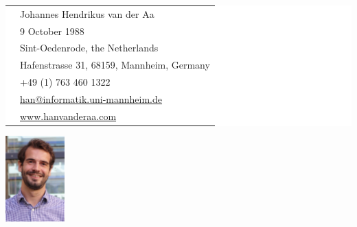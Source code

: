 \begin{paracol}{2}
	\hspace{2em}
\parbox[top][0.12\textheight][c]{1.00\linewidth}{ %
	\vspace{-0.04\textheight} %
	\colorbox{white}{ %
		\begin{supertabular}{ll} %
			 & Johannes Hendrikus van der Aa \\ %
			 & 9 October 1988 \\ %
			 & Sint-Oedenrode, the Netherlands \\ %
			 & Hafenstrasse 31, 68159, Mannheim, Germany \\ %
			 & +49 (1) 763 460 1322 \\ %
			 & \href{mailto:han@informatik.uni-mannheim.de}{han@informatik.uni-mannheim.de} \\ %
			 & \href{https://www.hanvanderaa.com}{www.hanvanderaa.com} \\ %
		\end{supertabular}
	}
}
\switchcolumn
\vspace{-1.5em}
\hspace{12em}
	\includegraphics[height=3.3cm]{figures/headshot.png}

\end{paracol}

\medskip
\vspace{0.3em}
